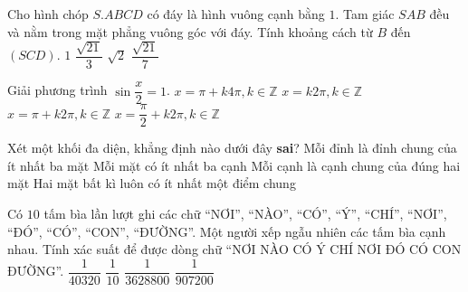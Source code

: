 \begin{ex}%
Cho hình chóp $S.ABCD$ có đáy là hình vuông cạnh bằng $1$. Tam giác $SAB$ đều và nằm trong mặt phẳng vuông góc với đáy. Tính khoảng cách từ $B$ đến $(SCD)$.
\choice
{$1$}
{$\dfrac{\sqrt{21}}{3}$}
{$\sqrt{2}$}
{\True $\dfrac{\sqrt{21}}{7}$}
\end{ex}

\begin{ex}%
Giải phương trình $\sin\dfrac{x}{2}=1$.
\choice
{\True $x=\pi+k4\pi, k\in\mathbb{Z}$}
{$x=k2\pi, k\in\mathbb{Z}$}
{$x=\pi+k2\pi, k\in\mathbb{Z}$}
{$x=\dfrac{\pi}{2}+k2\pi, k\in\mathbb{Z}$}
\end{ex}

\begin{ex}%
Xét một khối đa diện, khẳng định nào dưới đây \textbf{sai}?
\choice
{Mỗi đỉnh là đỉnh chung của ít nhất ba mặt}
{Mỗi mặt có ít nhất ba cạnh}
{Mỗi cạnh là cạnh chung của đúng hai mặt}
{\True Hai mặt bất kì luôn có ít nhất một điểm chung}
\end{ex}

\begin{ex}%
Có $10$ tấm bìa lần lượt ghi các chữ ``NƠI'', ``NÀO'', ``CÓ'', ``Ý'', ``CHÍ'', ``NƠI'', ``ĐÓ'', ``CÓ'', ``CON'', ``ĐƯỜNG''. Một người xếp ngẫu nhiên các tấm bìa cạnh nhau. Tính xác suất để được dòng chữ ``NƠI NÀO CÓ Ý CHÍ NƠI ĐÓ CÓ CON ĐƯỜNG''.
\choice
{$\dfrac{1}{40320}$}
{$\dfrac{1}{10}$}
{$\dfrac{1}{3628800}$}
{\True $\dfrac{1}{907200}$}
\end{ex}

